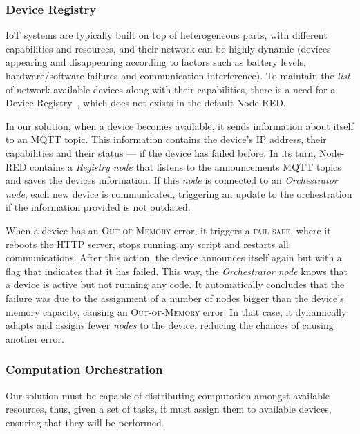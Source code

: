 \subsubsection{Device Registry}
\label{sec:registry}

IoT systems are typically built on top of heterogeneous parts, with different capabilities and resources, and their network can be highly-dynamic (devices appearing and disappearing according to factors such as battery levels, hardware/software failures and communication interference). To maintain the \textit{list} of network available devices along with their capabilities, there is a need for a Device Registry~\cite{Ramadas17}, which does not exists in the default Node-RED.

In our solution, when a device becomes available, it sends information about itself to an MQTT topic. This information contains the device's IP address, their capabilities and their status --- if the device has failed before. In its turn, Node-RED contains a \textit{Registry node} that listens to the announcements MQTT topics and saves the devices information. If this \textit{node} is connected to an \textit{Orchestrator node}, each new device is communicated, triggering an update to the orchestration if the information provided is not outdated.

When a device has an \textsc{Out-of-Memory} error, it triggers a \textsc{fail-safe}, where it reboots the HTTP server, stops running any script and restarts all communications. After this action, the device announces itself again but with a flag that indicates that it has failed. This way, the \textit{Orchestrator node} knows that a device is active but not running any code. It automatically concludes that the failure was due to the assignment of a number of nodes bigger than the device's memory capacity, causing an \textsc{Out-of-Memory} error. In that case, it dynamically adapts and assigns fewer \textit{nodes} to the device, reducing the chances of causing another error.

\subsubsection{Computation Orchestration}\label{sec:node_red_computation_decentralization}

Our solution must be capable of distributing computation amongst available resources, thus, given a set of tasks, it must assign them to available devices, ensuring that they will be performed.

